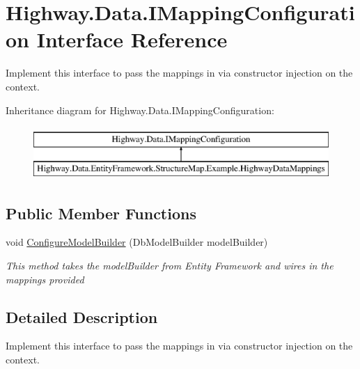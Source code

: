 \hypertarget{interface_highway_1_1_data_1_1_i_mapping_configuration}{\section{Highway.\-Data.\-I\-Mapping\-Configuration Interface Reference}
\label{interface_highway_1_1_data_1_1_i_mapping_configuration}
}


Implement this interface to pass the mappings in via constructor injection on the context.  


Inheritance diagram for Highway.\-Data.\-I\-Mapping\-Configuration\-:\begin{figure}[H]
\begin{center}
\leavevmode
\includegraphics[height=2.000000cm]{interface_highway_1_1_data_1_1_i_mapping_configuration}
\end{center}
\end{figure}
\subsection*{Public Member Functions}
\begin{DoxyCompactItemize}
\item 
void \hyperlink{interface_highway_1_1_data_1_1_i_mapping_configuration_abf9f940f87d0d312627dacb1e347ebdc}{Configure\-Model\-Builder} (Db\-Model\-Builder model\-Builder)
\begin{DoxyCompactList}\small\item\em This method takes the model\-Builder from Entity Framework and wires in the mappings provided \end{DoxyCompactList}\end{DoxyCompactItemize}


\subsection{Detailed Description}
Implement this interface to pass the mappings in via constructor injection on the context. 



